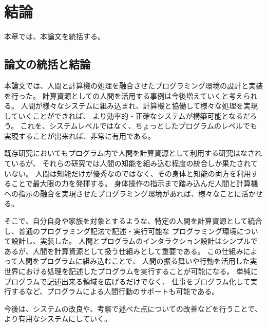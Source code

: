 \chapter{結論}\label{chap:conclusion}

本章では、本論文を統括する。

\newpage

\section{論文の統括と結論}\label{ux8ad6ux6587ux306eux7d71ux62ecux3068ux7d50ux8ad6}

本論文では、人間と計算機の処理を融合させたプログラミング環境の設計と実装を行った。
計算資源としての人間を活用する事例は今後増えていくと考えられる。
人間が様々なシステムに組み込まれ、計算機と協働して様々な処理を実現していくことができれば、
より効率的・正確なシステムが構築可能となるだろう。
これを、システムレベルではなく、ちょっとしたプログラムのレベルでも実現することが出来れば、非常に有用である。

既存研究においてもプログラム内で人間を計算資源として利用する研究はなされているが、
それらの研究では人間の知能を組み込む程度の統合しか果たされていない。
人間は知能だけが優秀なのではなく、その身体と知能の両方を利用することで最大限の力を発揮する。
身体操作の指示まで踏み込んだ人間と計算機への指示の融合を実現させたプログラミング環境があれば、様々なことに活かせる。

そこで、自分自身や家族を対象とするような、特定の人間を計算資源として統合し、普通のプログラミング記法で記述・実行可能な
プログラミング環境について設計し、実装した。
人間とプログラムのインタラクション設計はシンプルであるが、人間を計算資源として扱う仕組みとして重要である。
この仕組みによって人間をプログラムに組み込むことで、
人間の振る舞いや行動を活用した実世界における処理を記述したプログラムを実行することが可能になる。
単純にプログラムで記述出来る領域を広げるだけでなく、
仕事をプログラム化して実行するなど、プログラムによる人間行動のサポートも可能である。

今後は、システムの改良や、考察で述べた点についての改善などを行うことで、
より有用なシステムにしていく。
